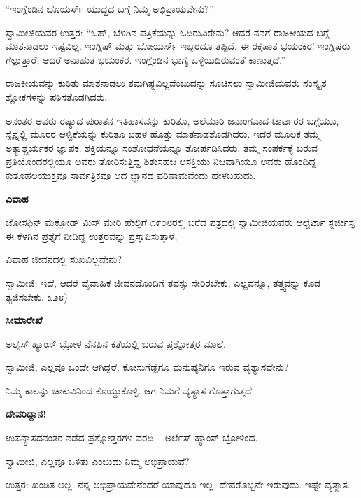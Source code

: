 “ಇಂಗ್ಲೆಂಡಿನ ಬೊಯರ್ಸ್ ಯುದ್ಧದ ಬಗ್ಗೆ ನಿಮ್ಮ ಅಭಿಪ್ರಾಯವೇನು?”

ಸ್ವಾಮೀಜಿಯವರ ಉತ್ತರ: “ಓಹ್, ಬೆಳಗಿನ ಪತ್ರಿಕೆಯನ್ನು ಓದಿರುವಿರೇನು? ಆದರೆ ನನಗೆ ರಾಜಕೀಯದ ಬಗ್ಗೆ ಮಾತನಾಡಲು ಇಷ್ಟವಿಲ್ಲ. ಇಂಗ್ಲಿಷ್ ಮತ್ತು ಬೋಯರ್ಸ್ ಇಬ್ಬರದೂ ತಪ್ಪಿದೆ. ಈ ರಕ್ತಪಾತ ಭಯಂಕರ! ಇಂಗ್ಲಿಷರು ಗೆಲ್ಲುತ್ತಾರೆ, ಆದರೆ ಅನಾಹುತ ಭಯಂಕರ. ಇಂಗ್ಲೆಂಡಿನ ಭಾಗ್ಯ ಒಳ್ಳೆಯದಿರುವಂತೆ ಕಾಣುತ್ತದೆ.”

ರಾಜಕೀಯವನ್ನು ಕುರಿತು ಮಾತನಾಡಲು ತಮಗಿಷ್ಟವಿಲ್ಲವೆಂಬುದನ್ನು ಸೂಚಿಸಲು ಸ್ವಾಮೀಜಿಯವರು ಸಂಸ್ಕೃತ ಶ್ಲೋಕಗಳನ್ನು ಪಠಿಸತೊಡಗಿದರು.

ಅನಂತರ ಅವರು ರಷ್ಯಾದ ಪುರಾತನ ಇತಿಹಾಸವನ್ನು ಕುರಿತೂ, ಅಲೆಮಾರಿ ಜನಾಂಗವಾದ ಟಾರ್ಟರರ ಬಗ್ಗೆಯೂ, ಸ್ಪೈನ್ನಲ್ಲಿ ಮೂರರ ಆಳ್ವಿಕೆಯನ್ನು ಕುರಿತೂ ಬಹಳ ಹೊತ್ತು ಮಾತನಾಡತೊಡಗಿದರು. ಇದರ ಮೂಲಕ ತಮ್ಮ ಅತ್ಯಾಶ್ಚರ್ಯಕರ ಜ್ಞಾಪಕ. ಶಕ್ತಿಯನ್ನೂ ಸಂಶೋಧನೆಯನ್ನೂ ತೋರ್ಪಡಿಸಿದರು. ತಮ್ಮ ಸಂಪರ್ಕಕ್ಕೆ ಬರುವ ಪ್ರತಿಯೊಂದರಲ್ಲಿಯೂ ಅವರು ತೋರಿಸುತ್ತಿದ್ದ ಶಿಶುಸಹಜ ಆಸಕ್ತಿಯು ನಿಜವಾಗಿಯೂ ಅವರು ಹೊಂದಿದ್ದ ಕುತೂಹಲಯುಕ್ತವೂ ಸಾರ್ವತ್ರಿಕವೂ ಆದ ಜ್ಞಾನದ ಪರಿಣಾಮವೆಂದು ಹೇಳಬಹುದು.

\begin{center}
\textbf{ವಿವಾಹ}
\end{center}

ಜೋಸಫಿನ್ ಮೆಕ್ಲೋಡ್ ಮಿಸ್ ಮೇರಿ ಹೇಲ್ಳಿಗೆ ೧೯೦೮ರಲ್ಲಿ ಬರೆದ ಪತ್ರದಲ್ಲಿ ಸ್ವಾಮೀಜಿಯವರು ಆಲ್ಬೆರ್ಟಾ ಸ್ಟರ್ಜೀಸ್ಳ ಈ ಕೆಳಗಿನ ಪ್ರಶ್ನೆಗೆ ನೀಡಿದ್ದ ಉತ್ತರವನ್ನು ಪ್ರಸ್ತಾಪಿಸುತ್ತಾಳೆ;

ವಿವಾಹ ಜೀವನದಲ್ಲಿ ಸುಖವಿಲ್ಲವೇನು?

ಸ್ವಾಮೀಜಿ: ಇದೆ, ಆದರೆ ವೈವಾಹಿಕ ಜೀವನದೊಂದಿಗೆ ತಪಸ್ಸು ಸೇರಿರಬೇಕು; ಎಲ್ಲವನ್ನೂ, ತತ್ತ್ವವನ್ನು ಕೂಡ ತ್ಯಜಿಸಬೇಕು.  ೩೨೮)

\begin{center}
\textbf{ಸೀಮಾರೇಖೆ}
\end{center}

ಅಲೈಸ್ ಹ್ಯಾಂಸ್ ಬ್ರೋಳ ನೆನಪಿನ ಕತೆಯಲ್ಲಿ ಬರುವ ಪ್ರಶ್ನೋತ್ತರ ಮಾಲೆ.

ಸ್ವಾಮೀಜಿ, ಎಲ್ಲವೂ ಒಂದೇ ಆಗಿದ್ದರೆ, ಕೋಸುಗೆಡ್ಡೆಗೂ ಮನುಷ್ಯನಿಗೂ ಇರುವ ವ್ಯತ್ಯಾಸವೇನು?

ನಿಮ್ಮ ಕಾಲನ್ನು ಚಾಕುವಿನಿಂದ ಕೊಯ್ದುಕೊಳ್ಳಿ. ಆಗ ನಿಮಗೆ ವ್ಯತ್ಯಾಸ ಗೊತ್ತಾಗುತ್ತದೆ.

\begin{center}
\textbf{ದೇವರಿದ್ದಾನೆ!}
\end{center}

ಉಪನ್ಯಾಸದನಂತರ ನಡೆದ ಪ್ರಶ್ನೋತ್ತರಗಳ ವರದಿ – ಅರ್ಲೆಸ್ ಹ್ಯಾಂಸ್ ಬ್ರೋಳಿಂದ.

ಸ್ವಾಮೀಜಿ, ಎಲ್ಲವೂ ಒಳಿತು ಎಂಬುದು ನಿಮ್ಮ ಅಭಿಪ್ರಾಯವೆ?

ಉತ್ತರ: ಖಂಡಿತ ಅಲ್ಲ. ನನ್ನ ಅಭಿಪ್ರಾಯವೇನೆಂದರೆ ಯಾವುದೂ ಇಲ್ಲ, ದೇವರೊಬ್ಬನೇ ಇರುವುದು. ಇಷ್ಟೇ ವ್ಯತ್ಯಾಸ.

